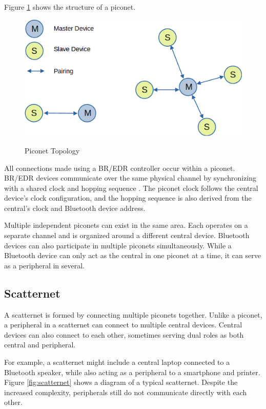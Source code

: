 Figure \ref{fig:piconet} shows the structure of a piconet.

\begin{figure}[h]
    \caption{Piconet Topology}
    \includegraphics[scale=.7]{piconet.png}
    \label{fig:piconet}
    \end{figure}

All connections made using a BR/EDR controller occur within a piconet. BR/EDR devices communicate over the same physical channel by synchronizing with a shared clock and hopping sequence \cite{bluetoothcorespec6}. The piconet clock follows the central device's clock configuration, and the hopping sequence is also derived from the central’s clock and Bluetooth device address.

Multiple independent piconets can exist in the same area. Each operates on a separate channel and is organized around a different central device. Bluetooth devices can also participate in multiple piconets simultaneously. While a Bluetooth device can only act as the central in one piconet at a time, it can serve as a peripheral in several.


\subsection{Scatternet}

A scatternet is formed by connecting multiple piconets together. Unlike a piconet, a peripheral in a scatternet can connect to multiple central devices. Central devices can also connect to each other, sometimes serving dual roles as both central and peripheral.

For example, a scatternet might include a central laptop connected to a Bluetooth speaker, while also acting as a peripheral to a smartphone and printer. Figure \ref{fig:scatternet} shows a diagram of a typical scatternet. Despite the increased complexity, peripherals still do not communicate directly with each other.


